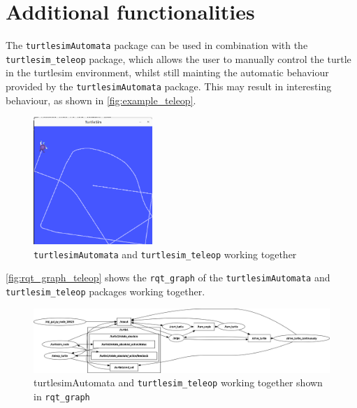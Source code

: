 \chapter{Additional functionalities}
\label{chapter:additional_functionalities}

The \texttt{turtlesimAutomata} package can be used in combination with the \texttt{turtlesim\_teleop} package, which allows the user to manually control the turtle in the turtlesim environment, whilst still mainting the automatic behaviour provided by the \texttt{turtlesimAutomata} package. This may result in interesting behaviour, as shown in \autoref{fig:example_teleop}.

\begin{figure}[htbp]
    \centering
    \includegraphics[width=0.4\textwidth]{./img/turtle_teleop_example.png}
    \caption{\texttt{turtlesimAutomata} and \texttt{turtlesim\_teleop} working together}
    \label{fig:example_teleop}
\end{figure}

\autoref{fig:rqt_graph_teleop} shows the \texttt{rqt\_graph} of the \texttt{turtlesimAutomata} and \texttt{turtlesim\_teleop} packages working together.

\begin{figure}[htbp]
    \centering
    \includegraphics[width=1\textwidth]{./img/rosgraph_teleop.png}
    \caption{turtlesimAutomata and \texttt{turtlesim\_teleop} working together shown in \texttt{rqt\_graph}}
    \label{fig:rqt_graph_teleop}
\end{figure}

